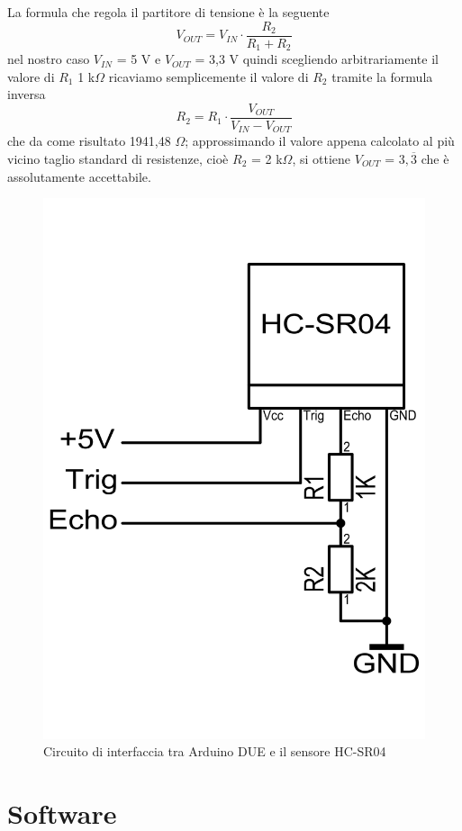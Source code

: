 La formula che regola il partitore di tensione è la seguente
$$V_{OUT}=V_{IN}\cdot\frac{R_2}{R_1+R_2}$$
nel nostro caso $V_{IN}$ = 5 V e $V_{OUT}$ = 3,3 V quindi scegliendo arbitrariamente 
il valore di $R_1$ 1 k$\Omega$ ricaviamo semplicemente il valore di $R_2$ tramite 
la formula inversa $$R_2 = R_1\cdot\frac{V_{OUT}}{V_{IN}-V_{OUT}}$$
che da come risultato 1941,48 $\Omega$; approssimando il valore appena calcolato
al più vicino taglio standard di resistenze, cioè $R_2 $ = 2 k$\Omega$, si ottiene $V_{OUT}$
 = $3,\overline{3}$ che è assolutamente accettabile.

\begin{figure}[!htb] \center
\includegraphics[scale=0.3]{immagini/HC-SR04_Circuito.png}
\caption{Circuito di interfaccia tra Arduino DUE e il sensore HC-SR04} 
\end{figure}

\section{Software}
